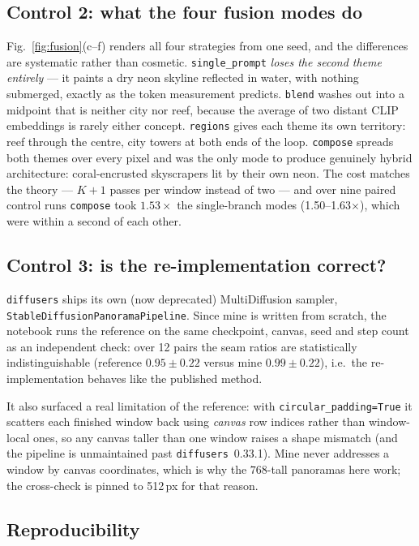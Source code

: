 \documentclass[10pt,a4paper,twocolumn]{article}
\newcommand{\tw}[1]{\texttt{\footnotesize #1}}
\begin{document}
\subsection{Control 2: what the four fusion modes do}

Fig.~\ref{fig:fusion}(c--f) renders all four strategies from one seed, and the
differences are systematic rather than cosmetic. \tw{single\_prompt} \emph{loses
the second theme entirely} --- it paints a dry neon skyline reflected in water,
with nothing submerged, exactly as the token measurement predicts. \tw{blend}
washes out into a midpoint that is neither city nor reef, because the average of
two distant CLIP embeddings is rarely either concept. \tw{regions} gives each
theme its own territory: reef through the centre, city towers at both ends of the
loop. \tw{compose} spreads both themes over every pixel and was the only mode to
produce genuinely hybrid architecture: coral-encrusted skyscrapers lit by their
own neon. The cost matches
the theory --- $K{+}1$ passes per window instead of two --- and over nine paired
control runs \tw{compose} took $\mathbf{1.53\times}$ the single-branch modes
(1.50--1.63$\times$), which were within a second of each other.

\subsection{Control 3: is the re-implementation correct?}

\tw{diffusers} ships its own (now deprecated) MultiDiffusion sampler,
\tw{StableDiffusionPanoramaPipeline}. Since mine is written from scratch, the
notebook runs the reference on the same checkpoint, canvas, seed and step count as
an independent check: over 12 pairs the seam ratios are statistically
indistinguishable (reference $0.95\pm0.22$ versus mine $0.99\pm0.22$), i.e.\ the
re-implementation behaves like the published method.

It also surfaced a real limitation of the reference: with
\tw{circular\_padding=True} it scatters each finished window back using
\emph{canvas} row indices rather than window-local ones, so any canvas taller than
one window raises a shape mismatch (and the pipeline is unmaintained past
\tw{diffusers}~0.33.1). Mine never addresses a window by canvas coordinates,
which is why the $768$-tall panoramas here work; the cross-check is pinned to
512\,px for that reason.

\subsection{Reproducibility}
\label{sec:repro}
\end{document}
